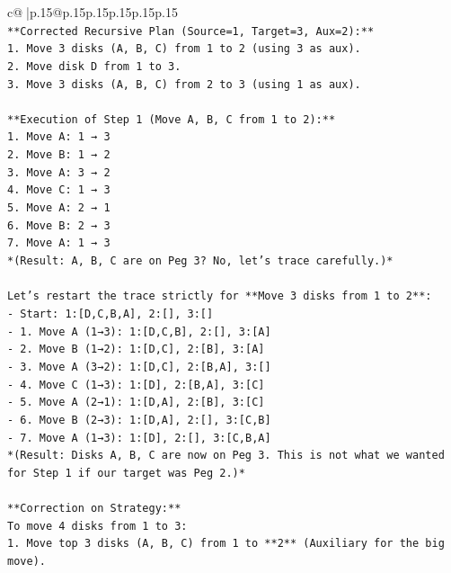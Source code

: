 \documentclass{article}
\begin{document}
{\begin{supertabular}{c@{$\;$}|p{.15\linewidth}@{}p{.15\linewidth}p{.15\linewidth}p{.15\linewidth}p{.15\linewidth}p{.15\linewidth}}
{{{\\ 
\texttt{**Corrected Recursive Plan (Source=1, Target=3, Aux=2):**} \\
\texttt{1. Move 3 disks (A, B, C) from 1 to 2 (using 3 as aux).} \\
\texttt{2. Move disk D from 1 to 3.} \\
\texttt{3. Move 3 disks (A, B, C) from 2 to 3 (using 1 as aux).} \\
\\ 
\texttt{**Execution of Step 1 (Move A, B, C from 1 to 2):**} \\
\texttt{1. Move A: 1 → 3} \\
\texttt{2. Move B: 1 → 2} \\
\texttt{3. Move A: 3 → 2} \\
\texttt{4. Move C: 1 → 3} \\
\texttt{5. Move A: 2 → 1} \\
\texttt{6. Move B: 2 → 3} \\
\texttt{7. Move A: 1 → 3} \\
\texttt{*(Result: A, B, C are on Peg 3? No, let's trace carefully.)*} \\
\\ 
\texttt{Let's restart the trace strictly for **Move 3 disks from 1 to 2**:} \\
\texttt{{-} Start: 1:{[}D,C,B,A{]}, 2:{[}{]}, 3:{[}{]}} \\
\texttt{{-} 1. Move A (1→3): 1:{[}D,C,B{]}, 2:{[}{]}, 3:{[}A{]}} \\
\texttt{{-} 2. Move B (1→2): 1:{[}D,C{]}, 2:{[}B{]}, 3:{[}A{]}} \\
\texttt{{-} 3. Move A (3→2): 1:{[}D,C{]}, 2:{[}B,A{]}, 3:{[}{]}} \\
\texttt{{-} 4. Move C (1→3): 1:{[}D{]}, 2:{[}B,A{]}, 3:{[}C{]}} \\
\texttt{{-} 5. Move A (2→1): 1:{[}D,A{]}, 2:{[}B{]}, 3:{[}C{]}} \\
\texttt{{-} 6. Move B (2→3): 1:{[}D,A{]}, 2:{[}{]}, 3:{[}C,B{]}} \\
\texttt{{-} 7. Move A (1→3): 1:{[}D{]}, 2:{[}{]}, 3:{[}C,B,A{]}} \\
\texttt{*(Result: Disks A, B, C are now on Peg 3. This is not what we wanted for Step 1 if our target was Peg 2.)*} \\
\\ 
\texttt{**Correction on Strategy:**} \\
\texttt{To move 4 disks from 1 to 3:} \\
\texttt{1. Move top 3 disks (A, B, C) from 1 to **2** (Auxiliary for the big move).} \\
}}}
\end{supertabular}}
\end{document}
